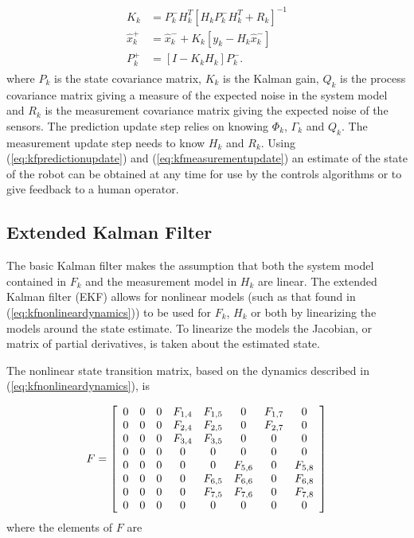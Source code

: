 \begin{align}
\label{eq:kfmeasurementupdate}
\begin{split}
K_k &= P_k^-H_k^T\left[H_kP_k^-H_k^T + R_k\right]^{-1} \\
\hat{x}_k^+ &= \hat{x}_k^- + K_k\left[y_k - H_k\hat{x}_k^-\right] \\
P_k^+ &= \left[I - K_kH_k\right]P_k^-.
\end{split}
\end{align}
where $P_k$ is the state covariance matrix, $K_k$ is the Kalman gain, $Q_k$ is the process covariance matrix giving a measure of the expected noise in the system model and $R_k$ is the measurement covariance matrix giving the expected noise of the sensors. The prediction update step relies on knowing $\Phi_k$, $\Gamma_k$ and $Q_k$. The measurement update step needs to know $H_k$ and $R_k$. Using (\ref{eq:kfpredictionupdate}) and (\ref{eq:kfmeasurementupdate}) an estimate of the state of the robot can be obtained at any time for use by the controls algorithms or to give feedback to a human operator.

\subsection{Extended Kalman Filter}
\label{sec:extendedkf}
The basic Kalman filter makes the assumption that both the system model contained in $F_k$ and the measurement model in $H_k$ are linear. The extended Kalman filter (EKF) allows for nonlinear models (such as that found in (\ref{eq:kfnonlineardynamics})) to be used for $F_k$, $H_k$ or both by linearizing the models around the state estimate. To linearize the models the Jacobian, or matrix of partial derivatives, is taken about the estimated state.

The nonlinear state transition matrix, based on the dynamics described in (\ref{eq:kfnonlineardynamics}), is

\begin{align}
\label{eq:kfF}
F = \left[\begin{array}{c c c c c c c c}
0 & 0 & 0 & F_{1,4} & F_{1,5} & 0 & F_{1,7} & 0 \\
0 & 0 & 0 & F_{2,4} & F_{2,5} & 0 & F_{2,7} & 0 \\
0 & 0 & 0 & F_{3,4} & F_{3,5} & 0 & 0 & 0 \\
0 & 0 & 0 & 0 & 0 & 0 & 0 & 0 \\
0 & 0 & 0 & 0 & 0 & F_{5,6} & 0 & F_{5,8} \\
0 & 0 & 0 & 0 & F_{6,5} & F_{6,6} & 0 & F_{6,8} \\
0 & 0 & 0 & 0 & F_{7,5} & F_{7,6} & 0 & F_{7,8} \\
0 & 0 & 0 & 0 & 0 & 0 & 0 & 0
\end{array}\right]
\end{align}
where the elements of $F$ are

